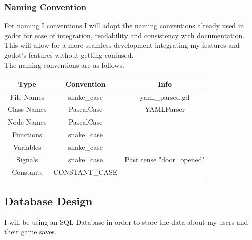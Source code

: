 \documentclass{article}
\begin{document}
        \subsubsection{Naming Convention}
        For naming I conventions I will adopt the naming conventions already used in godot for ease of integration, readability and consistency with documentation. This will allow for a more seamless development integrating my features and godot's features without getting confused.\\
        The naming conventions are as follows.\\
        \begin{tabular}{|c|c|c|}
                \hline
                Type&Convention&Info\\
                \hline
                File Names&snake\_case&yaml\_parsed.gd\\
                \hline
                Class Names&PascalCase&YAMLParser\\
                \hline
                Node Names&PascalCase&\\
                \hline
                Functions&snake\_case&\\
                \hline
                Variables&snake\_case&\\
                \hline
                Signals&snake\_case& Past tense "door\_opened"\\
                \hline
                Constants&CONSTANT\_CASE&\\
                \hline
        \end{tabular}
        \subsection{Database Design}
        I will be using an SQL Database in order to store the data about my users and their game saves.\\
\end{document}
